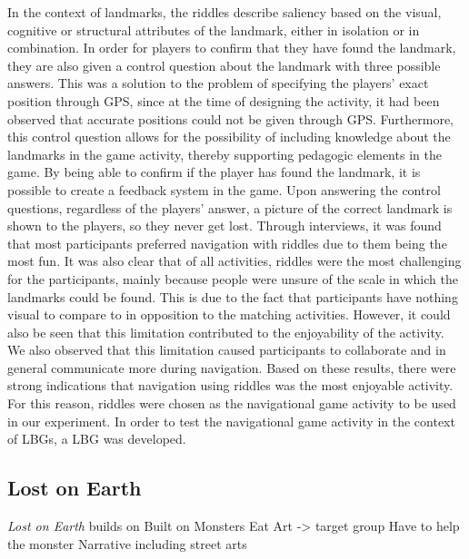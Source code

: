 In the context of landmarks, the riddles describe saliency based on the visual, cognitive or structural attributes of the landmark, either in isolation or in combination. In order for players to confirm that they have found the landmark, they are also given a control question about the landmark with three possible answers. This was a solution to the problem of specifying the players' exact position through GPS, since at the time of designing the activity, it had been observed that accurate positions could not be given through GPS. Furthermore, this control question allows for the possibility of including knowledge about the landmarks in the game activity, thereby supporting pedagogic elements in the game. By being able to confirm if the player has found the landmark, it is possible to create a feedback system in the game. Upon answering the control questions, regardless of the players' answer, a picture of the correct landmark is shown to the players, so they never get lost. Through interviews, it was found that most participants preferred navigation with riddles due to them being the most fun. It was also clear that of all activities, riddles were the most challenging for the participants, mainly because people were unsure of the scale in which the landmarks could be found. This is due to the fact that participants have nothing visual to compare to in opposition to the matching activities. However, it could also be seen that this limitation contributed to the enjoyability of the activity. We also observed that this limitation caused participants to collaborate and in general communicate more during navigation. Based on these results, there were strong indications that navigation using riddles was the most enjoyable activity. For this reason, riddles were chosen as the navigational game activity to be used in our experiment. In order to test the navigational game activity in the context of LBGs, a LBG was developed.

\subsection{Lost on Earth}
\textit{Lost on Earth} builds on 
Built on Monsters Eat Art -> target group
Have to help the monster
Narrative including street arts
